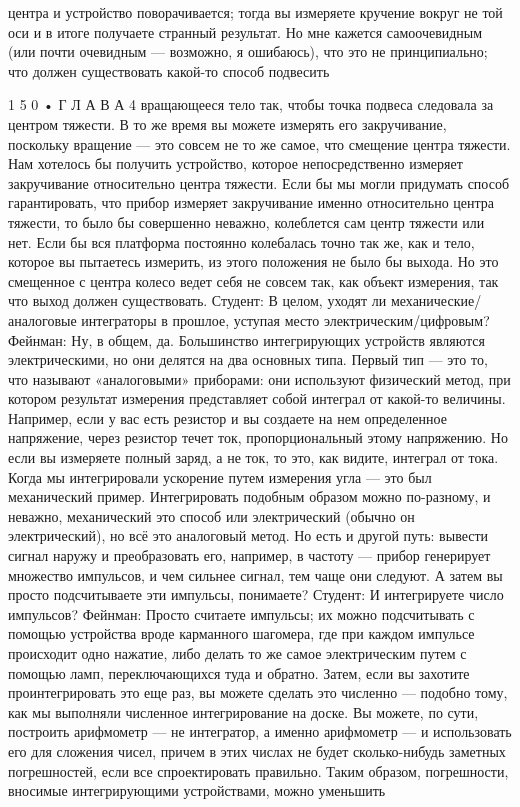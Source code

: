 \documentclass[10pt,oneside]{article}
\begin{document}
центра и устройство поворачивается; тогда вы измеряете кручение вокруг не той оси и в итоге получаете странный результат. Но мне кажется самоочевидным (или почти очевидным --- возможно, я ошибаюсь), что это не принципиально; что должен существовать какой-то способ подвесить\par

1 5 0 • Г Л А В А  4 вращающееся тело так, чтобы точка подвеса следовала за центром тяжести. В то же время вы можете измерять его закручивание, поскольку вращение --- это совсем не то же самое, что смещение центра тяжести. Нам хотелось бы получить устройство, которое непосредственно измеряет закручивание относительно центра тяжести. Если бы мы могли придумать способ гарантировать, что прибор измеряет закручивание именно относительно центра тяжести, то было бы совершенно неважно, колеблется сам центр тяжести или нет. Если бы вся платформа постоянно колебалась точно так же, как и тело, которое вы пытаетесь измерить, из этого положения не было бы выхода. Но это смещенное с центра колесо ведет себя не совсем так, как объект измерения, так что выход должен существовать. Студент: В целом, уходят ли механические/аналоговые интеграторы в прошлое, уступая место электрическим/цифровым? Фейнман: Ну, в общем, да. Большинство интегрирующих устройств являются электрическими, но они делятся на два основных типа. Первый тип --- это то, что называют «аналоговыми» приборами: они используют физический метод, при котором результат измерения представляет собой интеграл от какой-то величины. Например, если у вас есть резистор и вы создаете на нем определенное напряжение, через резистор течет ток, пропорциональный этому напряжению. Но если вы измеряете полный заряд, а не ток, то это, как видите, интеграл от тока. Когда мы интегрировали ускорение путем измерения угла --- это был механический пример. Интегрировать подобным образом можно по-разному, и неважно, механический это способ или электрический (обычно он электрический), но всё это аналоговый метод. Но есть и другой путь: вывести сигнал наружу и преобразовать его, например, в частоту --- прибор генерирует множество импульсов, и чем сильнее сигнал, тем чаще они следуют. А затем вы просто подсчитываете эти импульсы, понимаете? Студент: И интегрируете число импульсов? Фейнман: Просто считаете импульсы; их можно подсчитывать с помощью устройства вроде карманного шагомера, где при каждом импульсе происходит одно нажатие, либо делать то же самое электрическим путем с помощью ламп, переключающихся туда и обратно. Затем, если вы захотите проинтегрировать это еще раз, вы можете сделать это численно --- подобно тому, как мы выполняли численное интегрирование на доске. Вы можете, по сути, построить арифмометр --- не интегратор, а именно арифмометр --- и использовать его для сложения чисел, причем в этих числах не будет сколько-нибудь заметных погрешностей, если все спроектировать правильно. Таким образом, погрешности, вносимые интегрирующими устройствами, можно уменьшить\par
\end{document}

